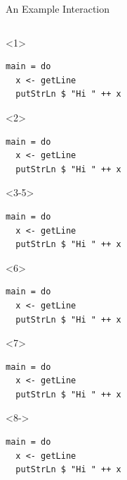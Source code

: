 \documentclass[aspectratio=169]{beamer}
\begin{document}
\begin{frame}[fragile]{An Example Interaction}
  \begin{columns}[t]
    \begin{column}{0.5\textwidth}
\begin{onlyenv}<1>
\begin{verbatim}
main = do
  x <- getLine
  putStrLn $ "Hi " ++ x
\end{verbatim}
\end{onlyenv}
\begin{onlyenv}<2>
\begin{verbatim}
main = do
  x <- getLine
  putStrLn $ "Hi " ++ x
\end{verbatim}
\end{onlyenv}
\begin{onlyenv}<3-5>
\begin{verbatim}
main = do
  x <- getLine
  putStrLn $ "Hi " ++ x
\end{verbatim}
\end{onlyenv}
\begin{onlyenv}<6>
\begin{verbatim}
main = do
  x <- getLine
  putStrLn $ "Hi " ++ x
\end{verbatim}
\end{onlyenv}
\begin{onlyenv}<7>
\begin{verbatim}
main = do
  x <- getLine
  putStrLn $ "Hi " ++ x
\end{verbatim}
\end{onlyenv}
\begin{onlyenv}<8->
\begin{verbatim}
main = do
  x <- getLine
  putStrLn $ "Hi " ++ x
\end{verbatim}
\end{onlyenv}

\end{column}
\end{columns}
\end{frame}
\end{document}
